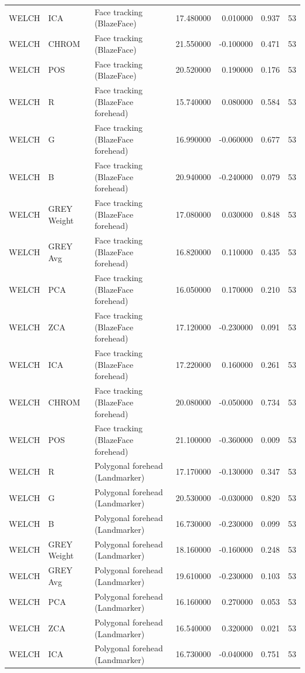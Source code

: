 \begin{table}[htbp]
\begin{tabular}{l l l r r l r}
WELCH & ICA & Face tracking (BlazeFace) & 17.480000 & 0.010000 & 0.937 & 53 \\
WELCH & CHROM & Face tracking (BlazeFace) & 21.550000 & -0.100000 & 0.471 & 53 \\
WELCH & POS & Face tracking (BlazeFace) & 20.520000 & 0.190000 & 0.176 & 53 \\
WELCH & R & Face tracking (BlazeFace forehead) & 15.740000 & 0.080000 & 0.584 & 53 \\
WELCH & G & Face tracking (BlazeFace forehead) & 16.990000 & -0.060000 & 0.677 & 53 \\
WELCH & B & Face tracking (BlazeFace forehead) & 20.940000 & -0.240000 & 0.079 & 53 \\
WELCH & GREY Weight & Face tracking (BlazeFace forehead) & 17.080000 & 0.030000 & 0.848 & 53 \\
WELCH & GREY Avg & Face tracking (BlazeFace forehead) & 16.820000 & 0.110000 & 0.435 & 53 \\
WELCH & PCA & Face tracking (BlazeFace forehead) & 16.050000 & 0.170000 & 0.210 & 53 \\
WELCH & ZCA & Face tracking (BlazeFace forehead) & 17.120000 & -0.230000 & 0.091 & 53 \\
WELCH & ICA & Face tracking (BlazeFace forehead) & 17.220000 & 0.160000 & 0.261 & 53 \\
WELCH & CHROM & Face tracking (BlazeFace forehead) & 20.080000 & -0.050000 & 0.734 & 53 \\
WELCH & POS & Face tracking (BlazeFace forehead) & 21.100000 & -0.360000 & 0.009 & 53 \\
WELCH & R & Polygonal forehead (Landmarker) & 17.170000 & -0.130000 & 0.347 & 53 \\
WELCH & G & Polygonal forehead (Landmarker) & 20.530000 & -0.030000 & 0.820 & 53 \\
WELCH & B & Polygonal forehead (Landmarker) & 16.730000 & -0.230000 & 0.099 & 53 \\
WELCH & GREY Weight & Polygonal forehead (Landmarker) & 18.160000 & -0.160000 & 0.248 & 53 \\
WELCH & GREY Avg & Polygonal forehead (Landmarker) & 19.610000 & -0.230000 & 0.103 & 53 \\
WELCH & PCA & Polygonal forehead (Landmarker) & 16.160000 & 0.270000 & 0.053 & 53 \\
WELCH & ZCA & Polygonal forehead (Landmarker) & 16.540000 & 0.320000 & 0.021 & 53 \\
WELCH & ICA & Polygonal forehead (Landmarker) & 16.730000 & -0.040000 & 0.751 & 53 \\

\end{tabular}
\end{table}
